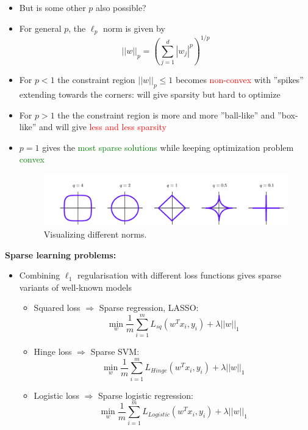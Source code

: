 \documentclass[12pt, a4paper]{article}
\begin{document}
\begin{itemize}
  \item But is some other $p$ also possible?
  \item For general $p$, the $\ell_p$ norm is given by
  $$
  ||w||_p = (\sum_{j=1}^d |w_j|^p)^{1/p}
  $$
  \item For $p < 1$ the constraint region $||w||_p \leq 1$ becomes \textcolor{red}{non-convex} with ”spikes” extending towards the corners: will give sparsity but hard to optimize
  \item For $p > 1$ the the constraint region is more and more ”ball-like” and ”box-like” and will give \textcolor{red}{less and less sparsity}
  \item $p = 1$ gives the \textcolor{Green}{most sparse solutions} while keeping optimization problem \textcolor{Green}{convex}
  \begin{figure}[H]
    \centering  %
      \includegraphics[width=1.0\columnwidth]{images/p-norms.png}
      \caption{Visualizing different norms.}
      \label{fig:p-norms}
  \end{figure}
\end{itemize}



\textbf{Sparse learning problems:}
\begin{itemize}
  \item Combining $\ell_1$ regularisation with different loss functions gives sparse variants of well-known models
  \begin{itemize}
    \item Squared loss $\Rightarrow$ Sparse regression, LASSO:
    $$
    \min_w \frac{1}{m} \sum^m_{i=1} L_{sq}(w^Tx_i, y_i) + \lambda ||w||_1
    $$
    \item Hinge loss $\Rightarrow$ Sparse SVM:
    $$
    \min_w \frac{1}{m} \sum^m_{i=1} L_{Hinge}(w^Tx_i, y_i) + \lambda ||w||_1
    $$
    \item Logistic loss $\Rightarrow$ Sparse logistic regression:
    $$
    \min_w \frac{1}{m} \sum^m_{i=1} L_{Logistic}(w^Tx_i, y_i) + \lambda ||w||_1
    $$
  \end{itemize}
\end{itemize}
\end{document}
